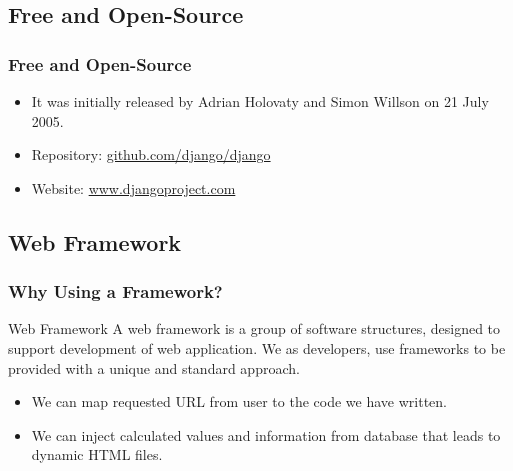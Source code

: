 \documentclass{beamer}
\begin{document}
\subsection{Free and Open-Source}
\begin{frame}
\frametitle{Free and Open-Source}
\begin{itemize}
	\item It was initially released by Adrian Holovaty and Simon Willson on 21 July 2005.
	\item Repository: \href{github.com/django/django}{github.com/django/django}
	\item Website: \href{www.djangoproject.com}{www.djangoproject.com}
\end{itemize}
\end{frame}


\subsection{Web Framework}
\begin{frame}
	\frametitle{Why Using a Framework?}
	\begin{block}{Web Framework}
		A web framework is a group of software structures, designed to support development of web application. We as developers, use frameworks to be provided with a unique and standard approach.
	\end{block}

	\begin{itemize}
		\item We can map requested URL from user to the code we have written.
		\item We can inject calculated values and information from database that leads to dynamic HTML files.
	\end{itemize}
\end{frame}
\end{document}
